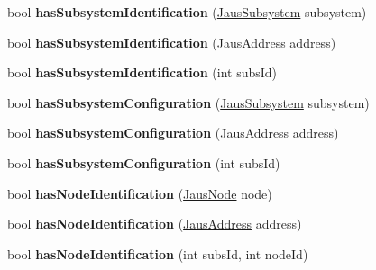 \begin{DoxyCompactItemize}
\item 
\hypertarget{class_system_tree_a5c66a325dcef9e39b7eb5dadf4d3f837}{bool {\bfseries has\-Subsystem\-Identification} (\hyperlink{struct_jaus_subsystem_struct}{\-Jaus\-Subsystem} subsystem)}\label{class_system_tree_a5c66a325dcef9e39b7eb5dadf4d3f837}

\item 
\hypertarget{class_system_tree_a590c1dbcdecf56e261e9218df13776ae}{bool {\bfseries has\-Subsystem\-Identification} (\hyperlink{struct_jaus_address_struct}{\-Jaus\-Address} address)}\label{class_system_tree_a590c1dbcdecf56e261e9218df13776ae}

\item 
\hypertarget{class_system_tree_a663a14ca5343d31f2afe4bcd88c1c67a}{bool {\bfseries has\-Subsystem\-Identification} (int subs\-Id)}\label{class_system_tree_a663a14ca5343d31f2afe4bcd88c1c67a}

\item 
\hypertarget{class_system_tree_a8c631f90c7ca7c2376b42633c946d2a6}{bool {\bfseries has\-Subsystem\-Configuration} (\hyperlink{struct_jaus_subsystem_struct}{\-Jaus\-Subsystem} subsystem)}\label{class_system_tree_a8c631f90c7ca7c2376b42633c946d2a6}

\item 
\hypertarget{class_system_tree_a99b27ce65f9f680c1745c82fb7b2c9dd}{bool {\bfseries has\-Subsystem\-Configuration} (\hyperlink{struct_jaus_address_struct}{\-Jaus\-Address} address)}\label{class_system_tree_a99b27ce65f9f680c1745c82fb7b2c9dd}

\item 
\hypertarget{class_system_tree_afffece8311d032f9acf4a1a2aa7889e0}{bool {\bfseries has\-Subsystem\-Configuration} (int subs\-Id)}\label{class_system_tree_afffece8311d032f9acf4a1a2aa7889e0}

\item 
\hypertarget{class_system_tree_a981f6a8e088b76aacea263702d2ac434}{bool {\bfseries has\-Node\-Identification} (\hyperlink{struct_jaus_node_struct}{\-Jaus\-Node} node)}\label{class_system_tree_a981f6a8e088b76aacea263702d2ac434}

\item 
\hypertarget{class_system_tree_af8b588ae90fb547ea1810851ac054505}{bool {\bfseries has\-Node\-Identification} (\hyperlink{struct_jaus_address_struct}{\-Jaus\-Address} address)}\label{class_system_tree_af8b588ae90fb547ea1810851ac054505}

\item 
\hypertarget{class_system_tree_a59586ca4219e3012ba8105f087ae4baf}{bool {\bfseries has\-Node\-Identification} (int subs\-Id, int node\-Id)}\label{class_system_tree_a59586ca4219e3012ba8105f087ae4baf}


\end{DoxyCompactItemize}
